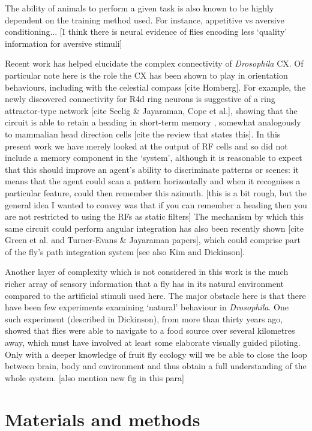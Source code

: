 The ability of animals to perform a given task is also known to be highly dependent on the training method used.
For instance, appetitive vs aversive conditioning...
[I think there is neural evidence of flies encoding less `quality' information for aversive stimuli]

Recent work has helped elucidate the complex connectivity of \emph{Drosophila} CX.
Of particular note here is the role the CX has been shown to play in orientation behaviours, including with the celestial compass [cite Homberg].
For example, the newly discovered connectivity for R4d ring neurons is suggestive of a ring attractor-type network [cite Seelig \& Jayaraman, Cope et al.], showing that the circuit is able to retain a heading in short-term memory \cite{Neuser2008}, somewhat analogously to mammalian head direction cells [cite the review that states this].
In this present work we have merely looked at the output of RF cells and so did not include a memory component in the `system', although it is reasonable to expect that this should improve an agent's ability to discriminate patterns or scenes:
it means that the agent could scan a pattern horizontally and when it recognises a particular feature, could then remember this azimuth.
[this is a bit rough, but the general idea I wanted to convey was that if you can remember a heading then you are not restricted to using the RFs as static filters]
The mechanism by which this same circuit could perform angular integration has also been recently shown [cite Green et al. and Turner-Evans \& Jayaraman papers], which could comprise part of the fly's path integration system [see also Kim and Dickinson].

Another layer of complexity which is not considered in this work is the much richer array of sensory information that a fly has in its natural environment compared to the artificial stimuli used here.
The major obstacle here is that there have been few experiments examining `natural' behaviour in \emph{Drosophila}.
One such experiment (described in Dickinson), from more than thirty years ago, showed that flies were able to navigate to a food source over several kilometres away, which must have involved at least some elaborate visually guided piloting.
Only with a deeper knowledge of fruit fly ecology will we be able to close the loop between brain, body and environment and thus obtain a full understanding of the whole system.
[also mention new fig in this para]

\section*{Materials and methods}
